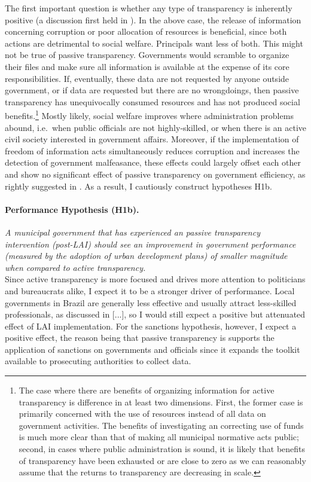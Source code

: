 \documentclass[11pt]{article}
\begin{document}
The first important question is whether any type of transparency is inherently positive (a discussion first held in \citet{PratWrongKindTransparency2005}). In the above case, the release of information concerning corruption or poor allocation of resources is beneficial, since both actions are detrimental to social welfare. Principals want less of both. This might not be true of passive transparency. Governments would scramble to organize their files and make sure all information is available at the expense of its core responsibilities. If, eventually, these data are not requested by anyone outside government, or if data are requested but there are no wrongdoings, then passive transparency has unequivocally consumed resources and has not produced social benefits.\footnote{The case where there are benefits of organizing information for active transparency is difference in at least two dimensions. First, the former case is primarily concerned with the use of resources instead of all data on government activities. The benefits of investigating an correcting use of funds is much more clear than that of making all municipal normative acts public; second, in cases where public administration is sound, it is likely that benefits of transparency have been exhausted or are close to zero as we can reasonably assume that the returns to transparency are decreasing in scale.} Mostly likely, social welfare improves where administration problems abound, i.e.~when public officials are not highly-skilled, or when there is an active civil society interested in government affairs. Moreover, if the implementation of freedom of information acts simultaneously reduces corruption and increases the detection of government malfeasance, these effects could largely offset each other and show no significant effect of passive transparency on government efficiency, as rightly suggested in \citet{CordisSunshineDisinfectantEffect2014}. As a result, I cautiously construct hypotheses H1b.

\paragraph{Performance Hypothesis (H1b).} \emph{A municipal government that has experienced an passive transparency intervention (post-LAI) should see an improvement in government performance (measured by the adoption of urban development plans) of smaller magnitude when compared to active transparency.}\\

Since active transparency is more focused and drives more attention to politicians and bureaucrats alike, I expect it to be a stronger driver of performance. Local governments in Brazil are generally less effective and usually attract less-skilled professionals, as discussed in [...], so I would still expect a positive but attenuated effect of LAI implementation. For the sanctions hypothesis, however, I expect a positive effect, the reason being that passive transparency is supports the application of sanctions on governments and officials since it expands the toolkit available to prosecuting authorities to collect data.
\end{document}
